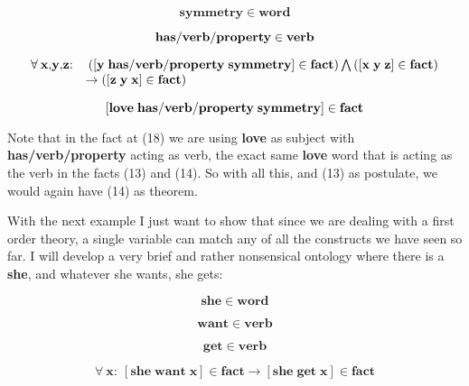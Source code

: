 \documentclass{IOS-Book-Article}     %
\begin{document}
\begin{equation}
  \mathbf{symmetry}\in \mathbf{word}
\end{equation}

\begin{equation}
  \mathbf{has\-/verb\-/property}\in \mathbf{verb}
\end{equation}

\begin{equation}
\begin{array}{ll}  \forall\:\mathbf{x}\mathrm{,}\mathbf{y}\mathrm{,}\mathbf{z}\mathrm{:} & \:\left(\left[\mathbf{y\; has\-/verb\-/property\; symmetry}\right]\in \mathbf{fact}\right)\bigwedge \left(\left[\mathbf{x\; y\; z}\right]\in \mathbf{fact}\right) \\ {} & \rightarrow\left(\left[\mathbf{z\; y\; x}\right]\in \mathbf{fact}\right)\end{array}
\end{equation}

\begin{equation}
  \left[\mathbf{love\; has\-/verb\-/property\; symmetry}\right]\in \mathbf{fact}
\end{equation}

Note that in the fact at (18) we are using \textbf{love} as
subject with \textbf{has\-/verb\-/property} acting as verb,
the exact same \textbf{love} word that is acting as the verb in the facts (13)
and (14). So with all this, and (13) as postulate, we would again have (14) as
theorem.

With the next example I just want to show that since we are dealing with a
first order theory, a single variable can match any of all the constructs we
have seen so far. I will develop a very brief and rather nonsensical ontology
where there is a \textbf{she}, and whatever she wants, she gets:

\begin{equation}
  \mathbf{she}\in \mathbf{word}
\end{equation}

\begin{equation}
  \mathbf{want}\in \mathbf{verb}
\end{equation}

\begin{equation}
  \mathbf{get}\in \mathbf{verb}
\end{equation}

\begin{equation}
\forall\:\mathbf{x}\mathrm{:} \:\left[\mathbf{she\; want\; x}\right]\in \mathbf{fact} \rightarrow\left[\mathbf{she\; get\; x}\right]\in \mathbf{fact}
\end{equation}
\end{document}
